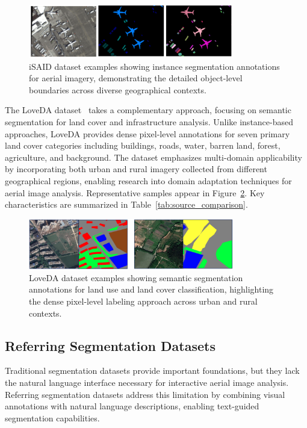 \begin{figure}[htbp]
\centering
\includegraphics[width=0.8\textwidth]{Images/isaid_examples.png}
\caption{iSAID dataset examples showing instance segmentation annotations for aerial imagery, demonstrating the detailed object-level boundaries across diverse geographical contexts.}
\label{fig:isaid_examples}
\end{figure}

The LoveDA dataset~\cite{wang2021loveda} takes a complementary approach, focusing on semantic segmentation for land cover and infrastructure analysis. Unlike instance-based approaches, LoveDA provides dense pixel-level annotations for seven primary land cover categories including buildings, roads, water, barren land, forest, agriculture, and background. The dataset emphasizes multi-domain applicability by incorporating both urban and rural imagery collected from different geographical regions, enabling research into domain adaptation techniques for aerial image analysis. Representative samples appear in Figure~\ref{fig:loveda_examples}. Key characteristics are summarized in Table~\ref{tab:source_comparison}.

\begin{figure}[htbp]
\centering
\includegraphics[width=0.8\textwidth]{Images/loveda.png}
\caption{LoveDA dataset examples showing semantic segmentation annotations for land use and land cover classification, highlighting the dense pixel-level labeling approach across urban and rural contexts.}
\label{fig:loveda_examples}
\end{figure}

\subsection{Referring Segmentation Datasets}

Traditional segmentation datasets provide important foundations, but they lack the natural language interface necessary for interactive aerial image analysis. Referring segmentation datasets address this limitation by combining visual annotations with natural language descriptions, enabling text-guided segmentation capabilities.

